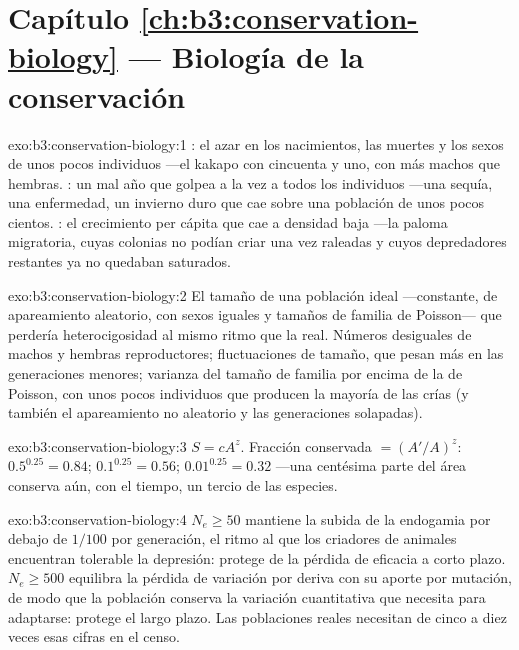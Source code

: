 \section*{Capítulo \ref{ch:b3:conservation-biology} --- Biología de la conservación}

\begin{solution}{exo:b3:conservation-biology:1}
: el azar en los nacimientos, las muertes y
los sexos de unos pocos individuos ---el kakapo con cincuenta y uno,
con más machos que hembras. : un mal año que
golpea a la vez a todos los individuos ---una sequía, una enfermedad, un
invierno duro que cae sobre una población de unos pocos cientos. : el crecimiento per cápita que cae a densidad baja ---la paloma
migratoria, cuyas colonias no podían criar una vez raleadas y cuyos
depredadores restantes ya no quedaban saturados.
\end{solution}

\begin{solution}{exo:b3:conservation-biology:2}
El tamaño de una población ideal ---constante, de apareamiento
aleatorio, con sexos iguales y tamaños de familia de Poisson--- que
perdería heterocigosidad al mismo ritmo que la real. Números desiguales
de machos y hembras reproductores; fluctuaciones de tamaño, que pesan
más en las generaciones menores; varianza del tamaño de familia por
encima de la de Poisson, con unos pocos individuos que producen la
mayoría de las crías (y también el apareamiento no aleatorio y las
generaciones solapadas).
\end{solution}

\begin{solution}{exo:b3:conservation-biology:3}
$S = cA^{z}$. Fracción conservada $= (A'/A)^{z}$: $0.5^{0.25} = 0.84$;
$0.1^{0.25} = 0.56$; $0.01^{0.25} = 0.32$ ---una centésima parte del
área conserva aún, con el tiempo, un tercio de las especies.
\end{solution}

\begin{solution}{exo:b3:conservation-biology:4}
$N_{e} \ge 50$ mantiene la subida de la endogamia por debajo de $1/100$
por generación, el ritmo al que los criadores de animales encuentran
tolerable la depresión: protege de la pérdida de eficacia a corto
plazo. $N_{e} \ge
500$ equilibra la pérdida de variación por deriva con su aporte por
mutación, de modo que la población conserva la variación cuantitativa
que necesita para adaptarse: protege el largo plazo. Las poblaciones
reales necesitan de cinco a diez veces esas cifras en el censo.
\end{solution}

